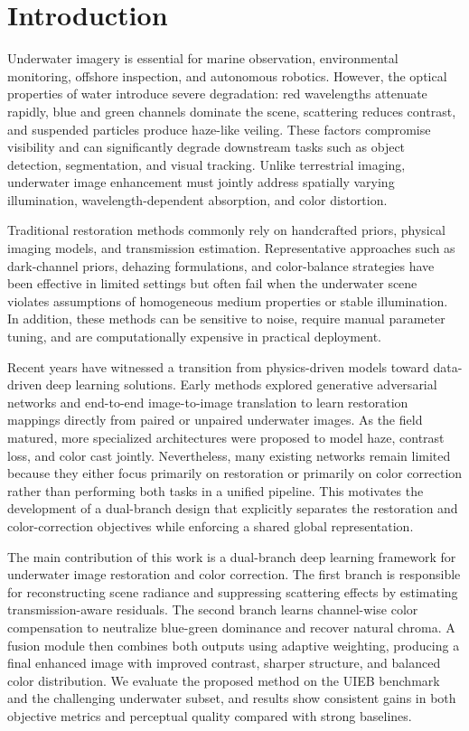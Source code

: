 \section{Introduction}

Underwater imagery is essential for marine observation, environmental monitoring, offshore inspection, and autonomous robotics. However, the optical properties of water introduce severe degradation: red wavelengths attenuate rapidly, blue and green channels dominate the scene, scattering reduces contrast, and suspended particles produce haze-like veiling. These factors compromise visibility and can significantly degrade downstream tasks such as object detection, segmentation, and visual tracking. Unlike terrestrial imaging, underwater image enhancement must jointly address spatially varying illumination, wavelength-dependent absorption, and color distortion.

Traditional restoration methods commonly rely on handcrafted priors, physical imaging models, and transmission estimation. Representative approaches such as dark-channel priors, dehazing formulations, and color-balance strategies have been effective in limited settings but often fail when the underwater scene violates assumptions of homogeneous medium properties or stable illumination. In addition, these methods can be sensitive to noise, require manual parameter tuning, and are computationally expensive in practical deployment.

Recent years have witnessed a transition from physics-driven models toward data-driven deep learning solutions. Early methods explored generative adversarial networks and end-to-end image-to-image translation to learn restoration mappings directly from paired or unpaired underwater images. As the field matured, more specialized architectures were proposed to model haze, contrast loss, and color cast jointly. Nevertheless, many existing networks remain limited because they either focus primarily on restoration or primarily on color correction rather than performing both tasks in a unified pipeline. This motivates the development of a dual-branch design that explicitly separates the restoration and color-correction objectives while enforcing a shared global representation.

The main contribution of this work is a dual-branch deep learning framework for underwater image restoration and color correction. The first branch is responsible for reconstructing scene radiance and suppressing scattering effects by estimating transmission-aware residuals. The second branch learns channel-wise color compensation to neutralize blue-green dominance and recover natural chroma. A fusion module then combines both outputs using adaptive weighting, producing a final enhanced image with improved contrast, sharper structure, and balanced color distribution. We evaluate the proposed method on the UIEB benchmark and the challenging underwater subset, and results show consistent gains in both objective metrics and perceptual quality compared with strong baselines.

